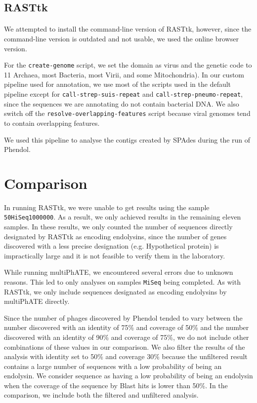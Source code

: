 \subsection{RASTtk}
\paragraph*{}
We attempted to install the command-line version of RASTtk, however, since the command-line version is outdated and not usable, we used the online browser version.

For the \texttt{create-genome} script, we set the domain as virus and the genetic code to 11 Archaea, most Bacteria, most Virii, and some Mitochondria). In our custom pipeline used for annotation, we use most of the scripts used in the default pipeline except for \texttt{call-strep-suis-repeat} and \texttt{call-strep-pneumo-repeat}, since the sequences we are annotating do not contain bacterial DNA. We also switch off the \texttt{resolve-overlapping-features} script because viral genomes tend to contain overlapping features.

We used this pipeline to analyse the contigs created by SPAdes during the run of Phendol.

\section{Comparison}
\paragraph*{}
In running RASTtk, we were unable to get results using the sample \texttt{50HiSeq1000000}. As a result, we only achieved results in the remaining eleven samples. In these results, we only counted the number of sequences directly designated by RASTtk as encoding endolysins, since the number of genes discovered with a less precise designation (e.g. Hypothetical protein) is impractically large and it is not feasible to verify them in the laboratory.

While running multiPhATE, we encountered several errors due to unknown reasons. This led to only analyses on samples \texttt{MiSeq} being completed. As with RASTtk, we only include sequences designated as encoding endolysins by multiPhATE directly.

Since the number of phages discovered by Phendol tended to vary between the number discovered with an identity of 75\% and coverage of 50\% and the number discovered with an identity of 90\% and coverage of 75\%, we do not include other combinations of these values in our comparison. We also filter the results of the analysis with identity set to 50\% and coverage 30\% because the unfiltered result contains a large number of sequences with a low probability of being an endolysin. We consider sequence as having a low probability of being an endolysin when the coverage of the sequence by Blast hits is lower than 50\%. In the comparison, we include both the filtered and unfiltered analysis.


